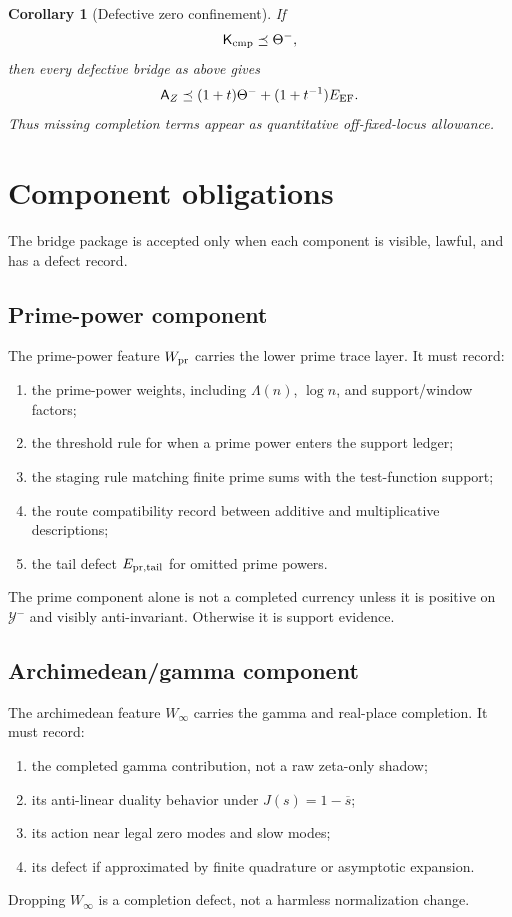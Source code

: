 \documentclass[11pt]{article}
\newtheorem{corollary}[theorem]{Corollary}
\newcommand{\K}{\mathsf K}
\newcommand{\A}{\mathsf A}
\newcommand{\Y}{\mathcal Y}
\begin{document}
\begin{corollary}[Defective zero confinement]
If
\[
  \K_{\rm cmp}\preceq\Theta^-,
\]
then every defective bridge as above gives
\[
  \A_Z\preceq (1+t)\Theta^-+(1+t^{-1})E_{\rm EF}.
\]
Thus missing completion terms appear as quantitative off-fixed-locus allowance.
\end{corollary}

\section{Component obligations}

The bridge package is accepted only when each component is visible, lawful, and has a defect record.

\subsection{Prime-power component}
The prime-power feature \(W_{\rm pr}\) carries the lower prime trace layer. It must record:
\begin{enumerate}[label=\textup{Pr\arabic*.}]
  \item the prime-power weights, including \(\Lambda(n)\), \(\log n\), and support/window factors;
  \item the threshold rule for when a prime power enters the support ledger;
  \item the staging rule matching finite prime sums with the test-function support;
  \item the route compatibility record between additive and multiplicative descriptions;
  \item the tail defect \(E_{\rm pr,tail}\) for omitted prime powers.
\end{enumerate}
The prime component alone is not a completed currency unless it is positive on \(\Y^-\) and visibly anti-invariant. Otherwise it is support evidence.

\subsection{Archimedean/gamma component}
The archimedean feature \(W_\infty\) carries the gamma and real-place completion. It must record:
\begin{enumerate}[label=\textup{Ga\arabic*.}]
  \item the completed gamma contribution, not a raw zeta-only shadow;
  \item its anti-linear duality behavior under \(J(s)=1-\overline{s}\);
  \item its action near legal zero modes and slow modes;
  \item its defect if approximated by finite quadrature or asymptotic expansion.
\end{enumerate}
Dropping \(W_\infty\) is a completion defect, not a harmless normalization change.
\end{document}
